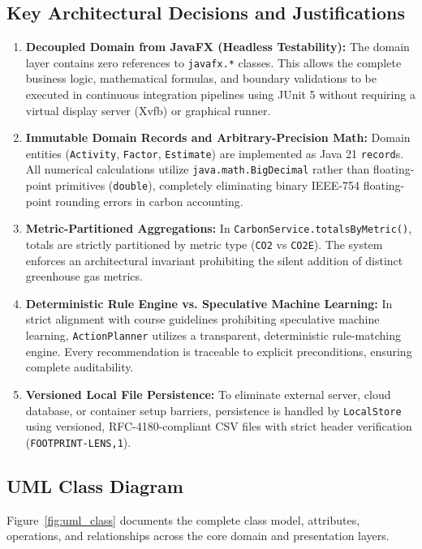 \documentclass[12pt,a4paper]{article}
\newcommand{\code}[1]{\texttt{#1}}
\begin{document}
\subsection{Key Architectural Decisions and Justifications}
\begin{enumerate}[label=\textbf{AD\arabic*.},leftmargin=*]
  \item \textbf{Decoupled Domain from JavaFX (Headless Testability):} The domain layer contains zero references to \code{javafx.*} classes. This allows the complete business logic, mathematical formulas, and boundary validations to be executed in continuous integration pipelines using JUnit 5 without requiring a virtual display server (Xvfb) or graphical runner.
  \item \textbf{Immutable Domain Records and Arbitrary-Precision Math:} Domain entities (\code{Activity}, \code{Factor}, \code{Estimate}) are implemented as Java 21 \code{record}s. All numerical calculations utilize \code{java.math.BigDecimal} rather than floating-point primitives (\code{double}), completely eliminating binary IEEE-754 floating-point rounding errors in carbon accounting.
  \item \textbf{Metric-Partitioned Aggregations:} In \code{CarbonService.totalsByMetric()}, totals are strictly partitioned by metric type (\code{CO2} vs \code{CO2E}). The system enforces an architectural invariant prohibiting the silent addition of distinct greenhouse gas metrics.
  \item \textbf{Deterministic Rule Engine vs. Speculative Machine Learning:} In strict alignment with course guidelines prohibiting speculative machine learning, \code{ActionPlanner} utilizes a transparent, deterministic rule-matching engine. Every recommendation is traceable to explicit preconditions, ensuring complete auditability.
  \item \textbf{Versioned Local File Persistence:} To eliminate external server, cloud database, or container setup barriers, persistence is handled by \code{LocalStore} using versioned, RFC-4180-compliant CSV files with strict header verification (\code{FOOTPRINT-LENS,1}).
\end{enumerate}

\subsection{UML Class Diagram}
Figure~\ref{fig:uml_class} documents the complete class model, attributes, operations, and relationships across the core domain and presentation layers.
\end{document}
